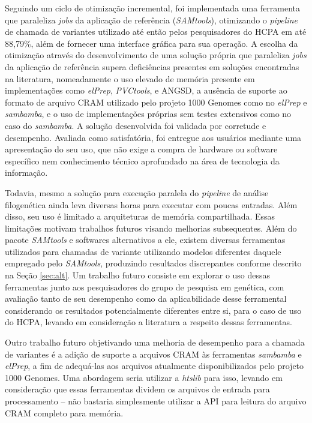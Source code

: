 \documentclass[cic,tc]{iiufrgs}
\begin{document}
Seguindo um ciclo de otimização incremental, foi implementada uma ferramenta
que paraleliza \textit{jobs} da aplicação de referência (\textit{SAMtools}),
otimizando o \textit{pipeline} de chamada de variantes utilizado até então
pelos pesquisadores do HCPA em até 88,79\%, além de fornecer uma interface
gráfica para sua operação. A escolha da otimização através do desenvolvimento
de uma solução própria que paraleliza \textit{jobs} da aplicação de referência
supera deficiências presentes em soluções encontradas na literatura,
nomeadamente o uso elevado de memória presente em implementações como
\textit{elPrep}, \textit{PVCtools}, e ANGSD, a ausência de suporte ao formato de arquivo
CRAM utilizado pelo projeto 1000 Genomes como no \textit{elPrep} e
\textit{sambamba}, e o uso de implementações próprias sem testes extensivos
como no caso do \textit{sambamba}. A solução desenvolvida foi validada por
corretude e desempenho. Avaliada como satisfatória, foi entregue aos usuários
mediante uma apresentação do seu uso, que não exige a compra de hardware ou
software específico nem conhecimento técnico aprofundado na área de tecnologia
da informação.

Todavia, mesmo a solução para execução paralela do \textit{pipeline} de análise
filogenética ainda leva diversas horas para executar com poucas entradas. Além
disso, seu uso é limitado a arquiteturas de memória compartilhada. Essas
limitações motivam trabalhos futuros visando melhorias subsequentes. Além do
pacote \textit{SAMtools} e softwares alternativos a ele, existem diversas
ferramentas utilizados para chamadas de variante utilizando modelos diferentes
daquele empregado pelo \textit{SAMtools}, produzindo resultados discrepantes
conforme descrito na Seção \ref{sec:alt}. Um trabalho futuro consiste em
explorar o uso dessas ferramentas junto aos pesquisadores do grupo de pesquisa
em genética, com avaliação tanto de seu desempenho como da aplicabilidade desse
ferramental considerando os resultados potencialmente diferentes entre si, para
o caso de uso do HCPA, levando em consideração a literatura a respeito dessas
ferramentas.

Outro trabalho futuro objetivando uma melhoria de desempenho para a chamada de
variantes é a adição de suporte a arquivos CRAM às ferramentas
\textit{sambamba} e \textit{elPrep}, a fim de adequá-las aos arquivos
atualmente disponibilizados pelo projeto 1000 Genomes. Uma abordagem seria
utilizar a \textit{htslib} para isso, levando em consideração que essas ferramentas
dividem os arquivos de entrada para processamento -- não bastaria simplesmente
utilizar a API para leitura do arquivo CRAM completo para memória.
\end{document}
